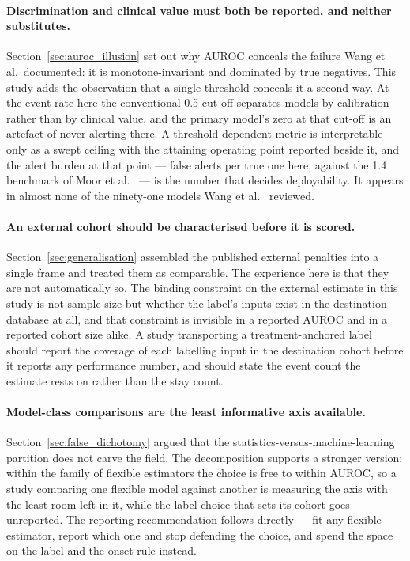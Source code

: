 \paragraph{Discrimination and clinical value must both be reported, and neither
substitutes.}
Section~\ref{sec:auroc_illusion} set out why AUROC conceals the failure Wang et
al.\ documented: it is monotone-invariant and dominated by true negatives.
This study adds the observation that a single threshold conceals it a second
way. At the event rate here the conventional 0.5 cut-off separates models by
calibration rather than by clinical value, and the primary model's zero at that
cut-off is an artefact of never alerting there. A threshold-dependent metric is
interpretable only as a swept ceiling with the attaining operating point
reported beside it, and the alert burden at that point ---
\pcUtilityOptBurdenGbtB{} false alerts per true one here, against the 1.4
benchmark of Moor et al.\ \cite{moor2023review} --- is the number that decides
deployability. It appears in almost none of the ninety-one models Wang et al.\
\cite{wang2025srpm} reviewed.

\paragraph{An external cohort should be characterised before it is scored.}
Section~\ref{sec:generalisation} assembled the published external penalties
into a single frame and treated them as comparable. The experience here is that
they are not automatically so. The binding constraint on the external estimate
in this study is not sample size but whether the label's inputs exist in the
destination database at all, and that constraint is invisible in a reported
AUROC and in a reported cohort size alike. A study transporting a
treatment-anchored label should report the coverage of each labelling input in
the destination cohort before it reports any performance number, and should
state the event count the estimate rests on rather than the stay count.

\paragraph{Model-class comparisons are the least informative axis available.}
Section~\ref{sec:false_dichotomy} argued that the statistics-versus-machine-learning
partition does not carve the field. The decomposition supports a stronger
version: within the family of flexible estimators the choice is free to within
\pcHSixEst{} AUROC, so a study comparing one flexible model against another is
measuring the axis with the least room left in it, while the label choice that
sets its cohort goes unreported. The reporting recommendation follows directly
--- fit any flexible estimator, report which one and stop defending the choice,
and spend the space on the label and the onset rule instead.

